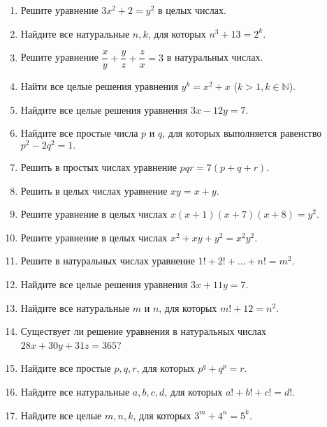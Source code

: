 \documentclass{article}
\begin{document}
\begin{enumerate}[label*=\protect\fbox{\arabic{enumi}}]

\item Решите уравнение $3x^2 + 2 = y^2$ в целых числах.

\item Найдите все натуральные $n, k$, для которых $n^3 + 13 = 2^k$.

\item Решите уравнение $\dfrac{x}{y} + \dfrac{y}{z} + \dfrac{z}{x} = 3$ в натуральных числах.

\item Найти все целые решения уравнения  $y^k = x^2 + x $ ($k > 1, k \in \mathbb{N}$).

\item Найдите все целые решения уравнения $3x - 12y = 7.$

\item Найдите все простые числа $p$ и $q$, для которых выполняется равенство  $p^2 - 2q^2 = 1.$

\item Решить в простых числах уравнение  $pqr = 7(p + q + r).$

\item Решить в целых числах уравнение  $xy = x + y.$

\item Решите уравнение в целых числах  $x(x+1)(x+7)(x+8) = y^2.$

\item Решите уравнение в целых числах  $x^2 + xy + y^2 = x^2y^2.$

\item Решите в натуральных числах уравнение   $1! + 2! + ... + n! = m^2$.

\item Найдите все целые решения уравнения $3x + 11y = 7.$

\item Найдите все натуральные $m$ и $n$, для которых $m! + 12 = n^2$.

\item Существует ли решение уравнения в натуральных числах $28x + 30y+ 31z = 365$?

\item Найдите все простые $p, q, r$, для которых $p^q + q^p = r$.

\item Найдите все натуральные $a, b, c, d$, для которых $a!+b!+c! = d!$.

\item Найдите все целые $m, n, k$, для которых $3^m + 4^n = 5^k$.


\end{enumerate}
\end{document}
